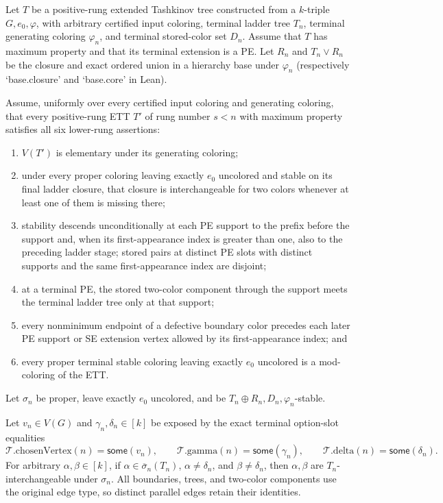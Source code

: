 \begin{lemma}
Let $T$ be a positive-rung extended Tashkinov tree constructed from a
$k$-triple $G,e_0,\varphi$, with arbitrary certified input coloring,
terminal ladder tree $T_n$, terminal generating coloring $\varphi_n$,
and terminal stored-color set $D_n$.  Assume that $T$ has maximum
property and that its terminal extension is a PE.  Let $R_n$ and
$T_n\vee R_n$ be the closure and exact ordered union in a hierarchy
base under $\varphi_n$ (respectively `base.closure' and `base.core'
in Lean).

Assume, uniformly over every certified input coloring and generating
coloring, that every positive-rung ETT $T'$ of rung number $s<n$ with
maximum property satisfies all six lower-rung assertions:
\begin{enumerate}
\item $V(T')$ is elementary under its generating coloring;
\item under every proper coloring leaving exactly $e_0$ uncolored and
stable on its final ladder closure, that closure is interchangeable for
two colors whenever at least one of them is missing there;
\item stability descends unconditionally at each PE support to the prefix before the
support and, when its first-appearance index is greater than one, also to
the preceding ladder stage; stored pairs at
distinct PE slots with distinct supports and the same first-appearance
index are disjoint;
\item at a terminal PE, the stored two-color component through the
support meets the terminal ladder tree only at that support;
\item every nonminimum endpoint of a defective boundary color precedes
each later PE support or SE extension vertex allowed by its
first-appearance index; and
\item every proper terminal stable coloring leaving exactly $e_0$
uncolored is a mod-coloring of the ETT.
\end{enumerate}

Let $\sigma_n$ be proper, leave exactly $e_0$ uncolored, and be
$T_n\oplus R_n,D_n,\varphi_n$-stable.

Let $v_n\in V(G)$ and $\gamma_n,\delta_n\in[k]$ be exposed by the
exact terminal option-slot equalities
\[
 \mathcal T.\mathrm{chosenVertex}(n)=\mathsf{some}(v_n),\qquad
 \mathcal T.\mathrm{gamma}(n)=\mathsf{some}(\gamma_n),\qquad
 \mathcal T.\mathrm{delta}(n)=\mathsf{some}(\delta_n).
\]
For arbitrary $\alpha,\beta\in[k]$, if
$\alpha\in\overline\sigma_n(T_n)$,
$\alpha\ne\delta_n$, and $\beta\ne\delta_n$, then
$\alpha,\beta$ are $T_n$-interchangeable under $\sigma_n$.
All boundaries, trees, and two-color components use the original edge
type, so distinct parallel edges retain their identities.
\end{lemma}
